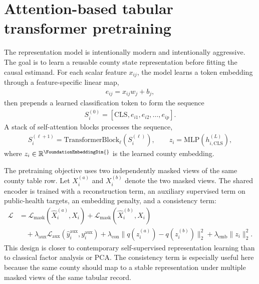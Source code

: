 \documentclass[11pt]{article}
\begin{document}
\section{Attention-based tabular transformer pretraining}
The representation model is intentionally modern and intentionally aggressive. The goal is to learn a reusable county state representation before fitting the causal estimand. For each scalar feature $x_{ij}$, the model learns a token embedding through a feature-specific linear map,
\begin{align}
 e_{ij} = x_{ij} w_j + b_j,
\end{align}
then prepends a learned classification token to form the sequence
\begin{align}
S_i^{(0)} = [\mathrm{CLS}, e_{i1}, e_{i2}, \ldots, e_{ip}].
\end{align}
A stack of self-attention blocks processes the sequence,
\begin{align}
S_i^{(\ell+1)} = \mathrm{TransformerBlock}_{\ell}(S_i^{(\ell)}), \qquad z_i = \mathrm{MLP}(h^{(L)}_{i,\mathrm{CLS}}),
\end{align}
where $z_i \in \mathbb{R}^{\FoundationEmbeddingDim{}}$ is the learned county embedding.

The pretraining objective uses two independently masked views of the same county table row. Let $X_i^{(a)}$ and $X_i^{(b)}$ denote the two masked views. The shared encoder is trained with a reconstruction term, an auxiliary supervised term on public-health targets, an embedding penalty, and a consistency term:
\begin{align}
\mathcal{L} &= \mathcal{L}_{\mathrm{mask}}(\hat X_i^{(a)}, X_i) + \mathcal{L}_{\mathrm{mask}}(\hat X_i^{(b)}, X_i) \\
&\quad + \lambda_{\mathrm{aux}} \mathcal{L}_{\mathrm{aux}}(\hat y_i^{\mathrm{aux}}, y_i^{\mathrm{aux}})
+ \lambda_{\mathrm{con}} \lVert q(z_i^{(a)}) - q(z_i^{(b)}) \rVert_2^2
+ \lambda_{\mathrm{emb}} \lVert z_i \rVert_2^2.
\end{align}
This design is closer to contemporary self-supervised representation learning than to classical factor analysis or PCA. The consistency term is especially useful here because the same county should map to a stable representation under multiple masked views of the same tabular record.

\begin{table}[H]
\centering
\caption{Implemented transformer configuration}
\end{table}
\end{document}
